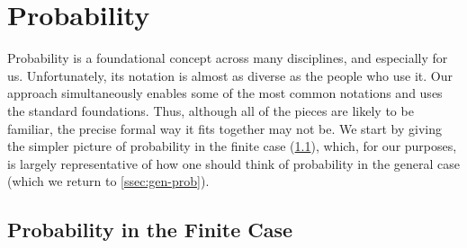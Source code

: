 \section{Probability}

Probability is a foundational concept across many disciplines, and especially for us. 
Unfortunately, its notation is almost as diverse as the people who use it. 
Our approach simultaneously enables some of the most common notations
    and uses the standard foundations. 
Thus, although all of the pieces are likely to be familiar, the precise formal way it fits together may not be. 
%
We start by giving the simpler picture of probability in the finite case (\cref{ssec:fin-prob}), which, for our purposes, is largely representative of how one should think of probability in the general case (which we return to \cref{ssec:gen-prob}).

\subsection{Probability in the Finite Case}
    \label{ssec:fin-prob}

